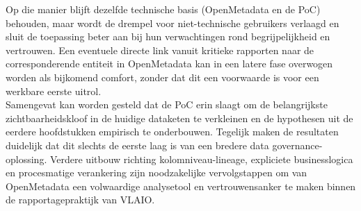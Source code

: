 Op die manier blijft dezelfde technische basis (OpenMetadata en de PoC) behouden, maar wordt de drempel voor niet-technische gebruikers verlaagd en sluit de toepassing beter aan bij hun verwachtingen rond begrijpelijkheid en vertrouwen. Een eventuele directe link vanuit kritieke rapporten naar de corresponderende entiteit in OpenMetadata kan in een latere fase overwogen worden als bijkomend comfort, zonder dat dit een voorwaarde is voor een werkbare eerste uitrol.\\

Samengevat kan worden gesteld dat de PoC erin slaagt om de belangrijkste zichtbaarheidskloof in de huidige dataketen te verkleinen en de hypothesen uit de eerdere hoofdstukken empirisch te onderbouwen. Tegelijk maken de resultaten duidelijk dat dit slechts de eerste laag is van een bredere data governance-oplossing. Verdere uitbouw richting kolomniveau-lineage, expliciete businesslogica en procesmatige verankering zijn noodzakelijke vervolgstappen om van OpenMetadata een volwaardige analysetool en vertrouwensanker te maken binnen de rapportagepraktijk van VLAIO.